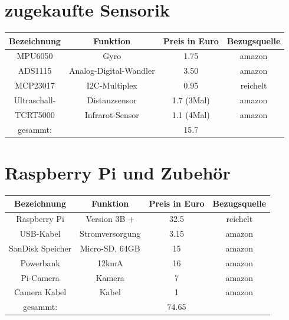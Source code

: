 \documentclass[twoside,12pt,a4paper]{report}
\begin{document}
	
	\section{zugekaufte Sensorik}
	\begin{center}
		\begin{tabular}{|c|c|c|c|}
			\hline
			Bezeichnung			&Funktion				& Preis	in Euro			&Bezugsquelle\\
			\hline
			MPU6050				&Gyro					& 1.75			& amazon		\\
			ADS1115				&Analog-Digital-Wandler	& 3.50			& amazon		\\
			MCP23017			&I2C-Multiplex			& 0.95			& reichelt		\\
			Ultraschall-		&Distanzsensor			& 1.7 (3Mal)	& amazon		\\
			TCRT5000			&Infrarot-Sensor		& 1.1 (4Mal)	& amazon		\\
			\hline
			gesammt:			&						&15.7			&\\
			\hline			
		\end{tabular}
	\end{center}
	
	\section{Raspberry Pi und Zubehör}
	\begin{center}
		\begin{tabular}{|c|c|c|c|}
			\hline
			Bezeichnung			&Funktion				& Preis	in Euro			&Bezugsquelle\\
			\hline
			Raspberry Pi 		& Version 3B +			& 32.5			& reichelt		\\
			USB-Kabel			& Stromversorgung		& 3.15			& amazon		\\
			SanDisk Speicher	& Micro-SD, 64GB		& 15			& amazon \\
			Powerbank			& 12kmA					& 16			& amazon \\
			Pi-Camera			&Kamera					& 7				& amazon		\\
			Camera Kabel		&Kabel					& 1				& amazon		\\
			\hline
			gesammt:			&						& 74.65				&\\
			\hline
		\end{tabular}
	\end{center}
	
\end{document}
